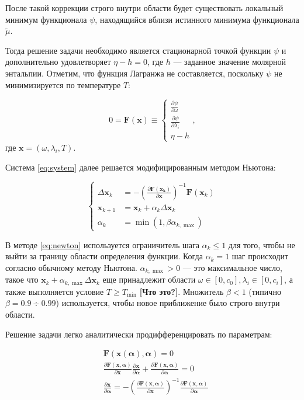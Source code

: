 \documentclass[12pt]{article}
\newcommand{\pd}[2]{\frac{\partial #1}{\partial #2}}
\let\dividesymbol\div
\renewcommand{\div}{\operatorname{div}}
\renewcommand{\geq}{\geqslant}
\renewcommand{\leq}{\leqslant}
\begin{document}
После такой коррекции строго внутри области будет существовать локальный минимум функционала $\psi$, находящийся вблизи истинного минимума функционала $\tilde\mu$.

Тогда решение задачи необходимо является стационарной точкой функции $\psi$ и дополнительно удовлетворяет $\eta - h = 0$, где $h$ --- заданное значение молярной энтальпии. Отметим, что функция Лагранжа не составляется, поскольку $\psi$ не минимизируется по температуре $T$:

\begin{equation}
0 = \mathbf{F}(\mathbf{x}) \equiv
\begin{cases}
 \pd{\psi}{\omega}\\
 \pd{\psi}{\lambda_i}\\
 \eta - h
\end{cases},
\label{eq:system}
\end{equation}
где $\mathbf{x} = (\omega, \lambda_i, T)$.

Система \eqref{eq:system} далее решается модифицированным методом Ньютона:

\begin{equation}
\left\{
\begin{aligned}
\Delta \mathbf{x}_k &= -\left(\pd{\mathbf{F(\mathbf{x}_k)}}{\mathbf{x}}\right)^{-1}
\mathbf{F}(\mathbf{x}_k)\\
\mathbf{x}_{k+1} &= \mathbf{x}_k + \alpha_k \Delta \mathbf{x}_k\\
\alpha_k &= \min(1, \beta \alpha_{k, \max})
\end{aligned}
\right.
\label{eq:newton}
\end{equation}

В методе \eqref{eq:newton} используется ограничитель шага $\alpha_k \leq 1$ для того, чтобы не выйти за границу области определения функции. Когда $\alpha_k = 1$ шаг происходит согласно обычному методу Ньютона. $\alpha_{k, \max} > 0$ --- это максимальное число, такое что $\mathbf{x}_k + \alpha_{k,\max} \Delta \mathbf{x}_{k}$ еще принадлежит области $\omega \in [0,c_0], \lambda_i \in [0, c_i]$, а также выполняется условие $T \geq T_{\min}$ \textbf{[Что это?]}. Множитель $\beta < 1$ (типично $\beta = 0.9 \dividesymbol 0.99$) используется, чтобы новое приближение было строго внутри области.

Решение задачи легко аналитически продифференцировать по параметрам:

\begin{equation}
\begin{aligned}
&\mathbf{F}(\mathbf{x}(\boldsymbol \alpha), \boldsymbol \alpha) = 0\\
&\pd{\mathbf{F}(\mathbf{x}, \boldsymbol \alpha)}{\mathbf{x}} \pd{\mathbf{x}}{\boldsymbol \alpha} +
\pd{\mathbf{F}(\mathbf{x}, \boldsymbol \alpha)}{\boldsymbol \alpha} = 0\\
&\pd{\mathbf{x}}{\boldsymbol \alpha} =
-\left(\pd{\mathbf{F}(\mathbf{x}, \boldsymbol \alpha)}{\mathbf{x}}\right)^{-1}
\pd{\mathbf{F}(\mathbf{x}, \boldsymbol \alpha)}{\boldsymbol \alpha} \\
\end{aligned}
\end{equation}
\end{document}
